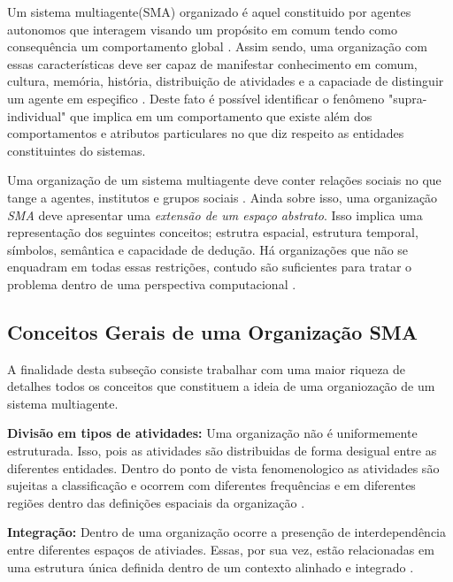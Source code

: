 Um sistema multiagente(SMA) organizado é aquel constituido por agentes autonomos que interagem visando um propósito em comum tendo como consequência um comportamento global \cite{mosieframework} 
\cite{organiationofmultiagentsystem}. Assim sendo, uma organização com essas características deve ser capaz de manifestar conhecimento em comum, cultura, memória, história, distribuição de atividades 
e a capaciade de distinguir um  agente em espeçifico \cite{organiationofmultiagentsystem}. Deste fato é possível identificar o fenômeno "supra-individual" que implica em um comportamento que existe
além dos comportamentos e atributos particulares no que diz respeito as entidades constituintes do sistemas. 

Uma organização de um sistema multiagente deve conter relações sociais no que tange a agentes, institutos e grupos sociais \cite{organiationofmultiagentsystem}. Ainda sobre isso, uma organização 
\textit{SMA} deve apresentar uma \textit{extensão de um espaço abstrato}. Isso implica uma representação dos seguintes conceitos; estrutra espacial, estrutura temporal, símbolos, semântica e 
capacidade de dedução. Há organizações que não se enquadram em todas essas restrições, contudo são suficientes para tratar o problema dentro de uma perspectiva computacional \cite{organiationofmultiagentsystem}.

\subsection{Conceitos Gerais de uma Organização SMA}

A finalidade desta subseção consiste trabalhar com uma maior riqueza de detalhes todos os conceitos que constituem a ideia de uma organiozação de um sistema multiagente.  
  
\textbf{Divisão em tipos de atividades:} Uma organização não é uniformemente estruturada. Isso, pois as atividades são distribuidas de forma desigual entre as diferentes entidades.
Dentro do ponto de vista fenomenologico as atividades são sujeitas a classificação e ocorrem com diferentes frequências e em diferentes regiões dentro das definições espaciais da organização \cite{organiationofmultiagentsystem}.

\textbf{Integração:} Dentro de uma organização ocorre a presenção de interdependência entre diferentes espaços de ativiades. Essas, por sua vez, estão relacionadas em uma estrutura única definida
dentro de um contexto alinhado e integrado \cite{organiationofmultiagentsystem}.

